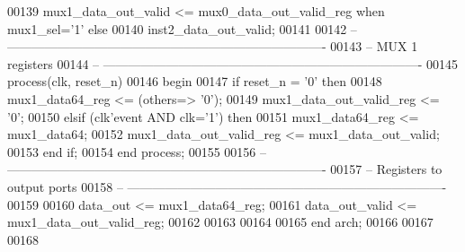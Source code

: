 \begin{DoxyCode}
00139 \textcolor{vhdlchar}{mux1_data_out_valid}         \textcolor{vhdlchar}{<=} \textcolor{vhdlchar}{mux0_data_out_valid_reg} \textcolor{keywordflow}{when} \textcolor{vhdlchar}{mux1_sel}\textcolor{vhdlchar}{=}\textcolor{vhdlchar}{'}\textcolor{vhdllogic}{}\textcolor{vhdllogic}{1}\textcolor{vhdlchar}{'} \textcolor{keywordflow}{else} 
00140                                     inst2\_data\_out\_valid;
00141                                     
00142 \textcolor{keyword}{-- ----------------------------------------------------------------------------}
00143 \textcolor{keyword}{-- MUX 1 registers}
00144 \textcolor{keyword}{-- ----------------------------------------------------------------------------                                 }
00145 \textcolor{keywordflow}{process}(clk, reset_n)
00146 \textcolor{vhdlkeyword}{begin }
00147     \textcolor{keywordflow}{if} \textcolor{vhdlchar}{reset_n} \textcolor{vhdlchar}{=} \textcolor{vhdlchar}{'}\textcolor{vhdllogic}{}\textcolor{vhdllogic}{0}\textcolor{vhdlchar}{'} \textcolor{keywordflow}{then} 
00148         \textcolor{vhdlchar}{mux1_data64_reg}             \textcolor{vhdlchar}{<=} \textcolor{vhdlchar}{(}\textcolor{keywordflow}{others}\textcolor{vhdlchar}{=}\textcolor{vhdlchar}{>} \textcolor{vhdlchar}{'}\textcolor{vhdllogic}{}\textcolor{vhdllogic}{0}\textcolor{vhdlchar}{'}\textcolor{vhdlchar}{)};
00149         \textcolor{vhdlchar}{mux1_data_out_valid_reg} \textcolor{vhdlchar}{<=} \textcolor{vhdlchar}{'}\textcolor{vhdllogic}{}\textcolor{vhdllogic}{0}\textcolor{vhdlchar}{'};
00150     \textcolor{keywordflow}{elsif} \textcolor{vhdlchar}{(}\textcolor{vhdlchar}{clk}\textcolor{vhdlchar}{'}\textcolor{vhdlkeyword}{event} \textcolor{keywordflow}{AND} \textcolor{vhdlchar}{clk}\textcolor{vhdlchar}{=}\textcolor{vhdlchar}{'}\textcolor{vhdllogic}{}\textcolor{vhdllogic}{1}\textcolor{vhdlchar}{'}\textcolor{vhdlchar}{)} \textcolor{keywordflow}{then} 
00151         \textcolor{vhdlchar}{mux1_data64_reg}             \textcolor{vhdlchar}{<=} \textcolor{vhdlchar}{mux1_data64};
00152         \textcolor{vhdlchar}{mux1_data_out_valid_reg} \textcolor{vhdlchar}{<=} \textcolor{vhdlchar}{mux1_data_out_valid};
00153     \textcolor{keywordflow}{end} \textcolor{keywordflow}{if};
00154 \textcolor{keywordflow}{end} \textcolor{keywordflow}{process};
00155 
00156 \textcolor{keyword}{-- ----------------------------------------------------------------------------}
00157 \textcolor{keyword}{-- Registers to output ports}
00158 \textcolor{keyword}{-- ----------------------------------------------------------------------------}
00159 
00160 \textcolor{vhdlchar}{data_out}        \textcolor{vhdlchar}{<=} \textcolor{vhdlchar}{mux1_data64_reg};
00161 \textcolor{vhdlchar}{data_out_valid} \textcolor{vhdlchar}{<=}   \textcolor{vhdlchar}{mux1_data_out_valid_reg};
00162 
00163 
00164 
00165 \textcolor{keywordflow}{end} \textcolor{vhdlchar}{arch};   
00166 
00167 
00168 
\end{DoxyCode}
